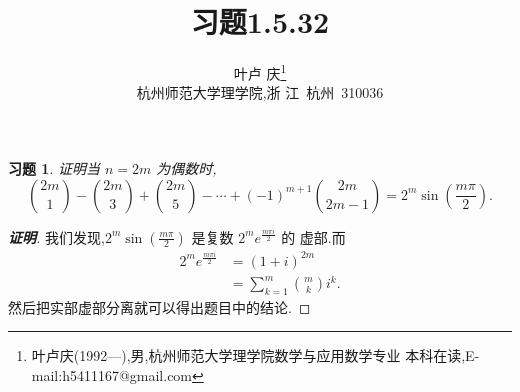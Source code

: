 \documentclass[a4paper]{article}
\newtheorem*{exercise}{习题}
\begin{document}
\title{\huge{\bf{习题1.5.32}}} \author{\small{叶卢
    庆\footnote{叶卢庆(1992---),男,杭州师范大学理学院数学与应用数学专业
      本科在读,E-mail:h5411167@gmail.com}}\\{\small{杭州师范大学理学院,浙
      江~杭州~310036}}}
\maketitle
\begin{exercise}
  证明当 $n=2m$ 为偶数时,
$$
{2m\choose 1}-{2m\choose 3}+{2m\choose 5}-\cdots+(-1)^{m+1}{2m\choose
  2m-1}=2^m\sin (\frac{m\pi}{2}).
$$
\end{exercise}
\begin{proof}[\textbf{证明}]
我们发现,$2^m\sin (\frac{m\pi}{2})$ 是复数 $2^me^{\frac{m\pi i}{2}}$ 的
虚部.而
  \begin{align*}
    2^me^{\frac{m\pi i}{2}}&=(1+i)^{2m}\\&=\sum_{k=1}^m {m\choose k}i^k.
  \end{align*}
然后把实部虚部分离就可以得出题目中的结论.
\end{proof}
\end{document}
